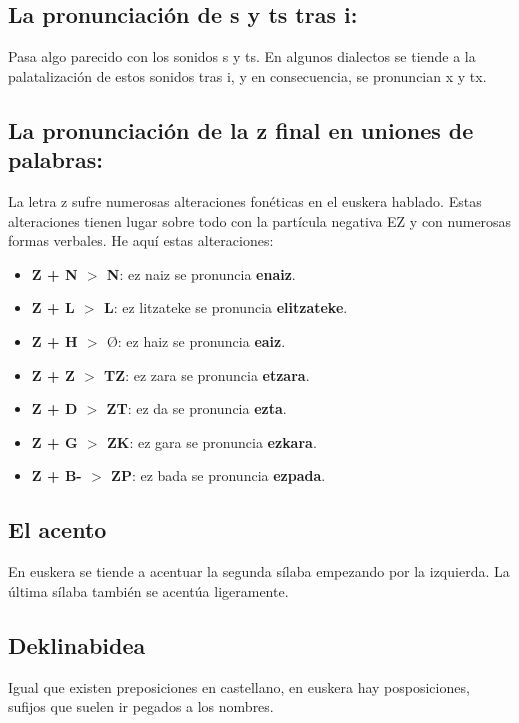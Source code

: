 \documentclass[11pt, a4paper]{article}
\begin{document}
\subsection{La pronunciación de s y ts tras i:}
Pasa algo parecido con los sonidos s y ts. En algunos dialectos se tiende a la palatalización de estos sonidos tras i, y en consecuencia, se pronuncian x y tx.

\subsection{La pronunciación de la z final en uniones de palabras:}
La letra z sufre numerosas alteraciones fonéticas en el euskera hablado. Estas alteraciones tienen lugar sobre todo con la partícula negativa EZ y con numerosas formas verbales. He aquí estas alteraciones: 
\begin{itemize}
	\item \textbf{Z + N $>$ N}: ez naiz se pronuncia \textbf{enaiz}.
	\item \textbf{Z + L $>$ L}: ez litzateke se pronuncia \textbf{elitzateke}.
	\item \textbf{Z + H $>$ $Ø$}: ez haiz se pronuncia \textbf{eaiz}.
	\item \textbf{Z + Z $>$ TZ}: ez zara se pronuncia \textbf{etzara}.
	\item \textbf{Z + D $>$ ZT}: ez da se pronuncia \textbf{ezta}.
	\item \textbf{Z + G $>$ ZK}: ez gara se pronuncia \textbf{ezkara}.
	\item \textbf{Z + B- $>$ ZP}: ez bada se pronuncia \textbf{ezpada}.
\end{itemize}

\subsection{El acento}
En euskera se tiende a acentuar la segunda sílaba empezando por la izquierda. La última sílaba también se acentúa ligeramente.

\subsection{Deklinabidea}
Igual que existen preposiciones en castellano, en euskera hay posposiciones, sufijos que suelen ir pegados a los nombres.
\end{document}
